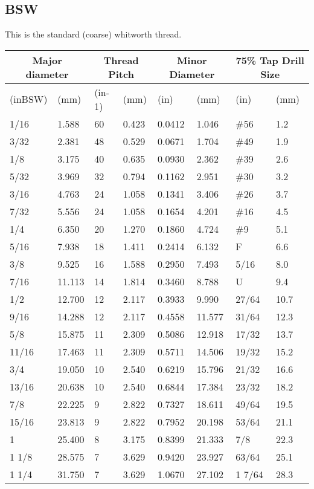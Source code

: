 \subsection{BSW}
This is the standard (coarse) whitworth thread.

\begin{table}[h!]
    \footnotesize
\begin{longtable}{ll|ll|ll|ll}
\multicolumn{2}{c}{ Major diameter}
	&\multicolumn{2}{c}{Thread Pitch}
	&\multicolumn{2}{c}{Minor Diameter}
	&\multicolumn{2}{c}{75\% Tap Drill Size}
	\\

\hline
(inBSW) &(mm) &(in-1) &(mm) &(in) &(mm) &(in) &(mm)\\
\hline
1/16 &1.588 &60 &0.423 &0.0412 &1.046 &\#56 &1.2\\
3/32 &2.381 &48 &0.529 &0.0671 &1.704 &\#49 &1.9\\
1/8 &3.175 &40 &0.635 &0.0930 &2.362 &\#39 &2.6\\
5/32 &3.969 &32 &0.794 &0.1162 &2.951 &\#30 &3.2\\
3/16 &4.763 &24 &1.058 &0.1341 &3.406 &\#26 &3.7\\
7/32 &5.556 &24 &1.058 &0.1654 &4.201 &\#16 &4.5\\
1/4 &6.350 &20 &1.270 &0.1860 &4.724 &\#9 &5.1\\
5/16 &7.938 &18 &1.411 &0.2414 &6.132 &F &6.6\\
3/8 &9.525 &16 &1.588 &0.2950 &7.493 &5/16 &8.0\\
7/16 &11.113 &14 &1.814 &0.3460 &8.788 &U &9.4\\
1/2 &12.700 &12 &2.117 &0.3933 &9.990 &27/64 &10.7\\
9/16 &14.288 &12 &2.117 &0.4558 &11.577 &31/64 &12.3\\
5/8 &15.875 &11 &2.309 &0.5086 &12.918 &17/32 &13.7\\
11/16 &17.463 &11 &2.309 &0.5711 &14.506 &19/32 &15.2\\
3/4 &19.050 &10 &2.540 &0.6219 &15.796 &21/32 &16.6\\
13/16 &20.638 &10 &2.540 &0.6844 &17.384 &23/32 &18.2\\
7/8 &22.225 &9 &2.822 &0.7327 &18.611 &49/64 &19.5\\
15/16 &23.813 &9 &2.822 &0.7952 &20.198 &53/64 &21.1\\
1 &25.400 &8 &3.175 &0.8399 &21.333 &7/8 &22.3\\
1 1/8 &28.575 &7 &3.629 &0.9420 &23.927 &63/64 &25.1\\
1 1/4 &31.750 &7 &3.629 &1.0670 &27.102 &1 7/64 &28.3\\

\end{longtable}
\end{table}
